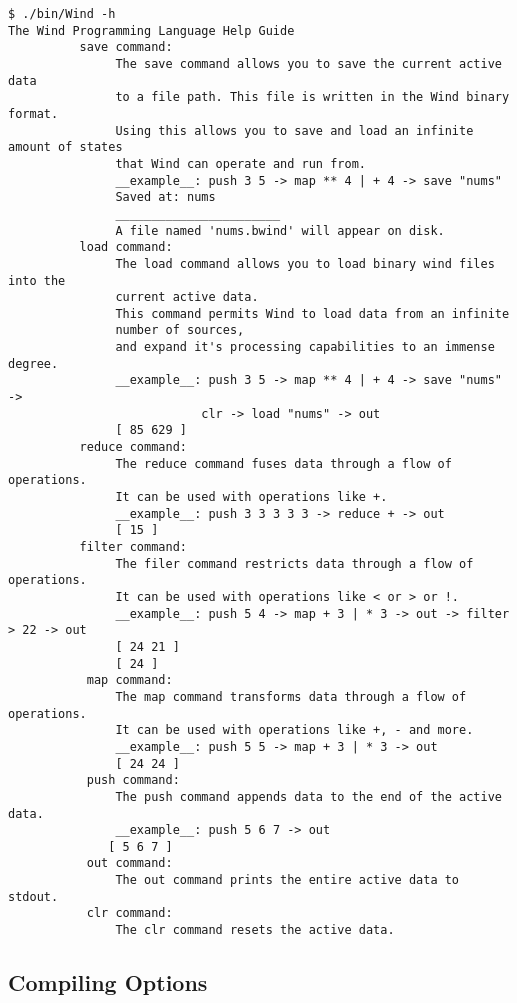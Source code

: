\begin{verbatim}
$ ./bin/Wind -h
The Wind Programming Language Help Guide
          save command: 
               The save command allows you to save the current active data 
               to a file path. This file is written in the Wind binary format.
               Using this allows you to save and load an infinite amount of states
               that Wind can operate and run from.
               __example__: push 3 5 -> map ** 4 | + 4 -> save "nums"
               Saved at: nums
               _______________________ 
               A file named 'nums.bwind' will appear on disk. 
          load command: 
               The load command allows you to load binary wind files into the 
               current active data. 
               This command permits Wind to load data from an infinite 
               number of sources, 
               and expand it's processing capabilities to an immense degree. 
               __example__: push 3 5 -> map ** 4 | + 4 -> save "nums" ->
                           clr -> load "nums" -> out
               [ 85 629 ] 
          reduce command: 
               The reduce command fuses data through a flow of operations. 
               It can be used with operations like +.
               __example__: push 3 3 3 3 3 -> reduce + -> out
               [ 15 ] 
          filter command: 
               The filer command restricts data through a flow of operations. 
               It can be used with operations like < or > or !. 
               __example__: push 5 4 -> map + 3 | * 3 -> out -> filter > 22 -> out 
               [ 24 21 ]
               [ 24 ]
           map command: 
               The map command transforms data through a flow of operations. 
               It can be used with operations like +, - and more. 
               __example__: push 5 5 -> map + 3 | * 3 -> out 
               [ 24 24 ]
           push command: 
               The push command appends data to the end of the active data. 
               __example__: push 5 6 7 -> out 
              [ 5 6 7 ]
           out command: 
               The out command prints the entire active data to stdout. 
           clr command: 
               The clr command resets the active data.
\end{verbatim}

\subsection{Compiling Options}

